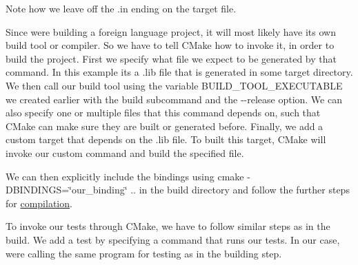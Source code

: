 Note how we leave off the {\ttfamily .in} ending on the target file.

Since we\textquotesingle{}re building a foreign language project, it will most likely have its own build tool or compiler. So we have to tell C\+Make how to invoke it, in order to build the project. First we specify what file we expect to be generated by that command. In this example it\textquotesingle{}s a {\ttfamily .lib} file that is generated in some target directory. We then call our build tool using the variable {\ttfamily B\+U\+I\+L\+D\+\_\+\+T\+O\+O\+L\+\_\+\+E\+X\+E\+C\+U\+T\+A\+B\+LE} we created earlier with the {\ttfamily build} subcommand and the {\ttfamily -\/-\/release} option. We can also specify one or multiple files that this command depends on, such that C\+Make can make sure they are built or generated before. Finally, we add a custom target that depends on the {\ttfamily .lib} file. To built this target, C\+Make will invoke our custom command and build the specified file.


\begin{DoxyCode}{0}
\end{DoxyCode}


We can then explicitly include the bindings using {\ttfamily cmake -\/D\+B\+I\+N\+D\+I\+N\+GS=\char`\"{}our\+\_\+binding\char`\"{} ..} in the build directory and follow the further steps for \mbox{\hyperlink{doc_COMPILE_md}{compilation}}.

To invoke our tests through C\+Make, we have to follow similar steps as in the build. We add a test by specifying a command that runs our tests. In our case, we\textquotesingle{}re calling the same program for testing as in the building step.


\begin{DoxyCode}{0}
\end{DoxyCode}


